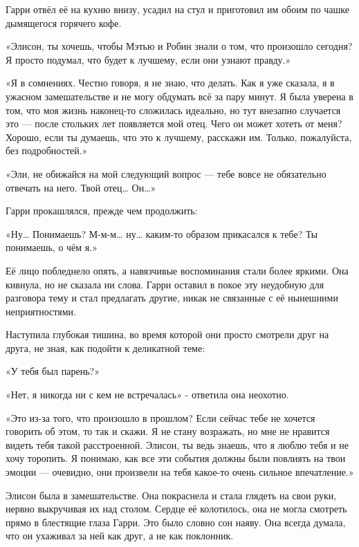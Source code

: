 \documentclass[a4paper,12pt]{book}
\begin{document}
\par
Гарри отвёл её на кухню внизу, усадил на стул и приготовил им обоим по чашке дымящегося горячего кофе.
\par
«Элисон, ты хочешь, чтобы Мэтью и Робин знали о том, что произошло сегодня? Я просто подумал, что будет к лучшему, если они узнают правду.»
\par
«Я в сомнениях. Честно говоря, я не знаю, что делать. Как я уже сказала, я в ужасном замешательстве и не могу обдумать всё за пару минут. Я была уверена в том, что моя жизнь наконец-то сложилась идеально, но тут внезапно случается это — после стольких лет появляется мой отец. Чего он может хотеть от меня? Хорошо, если ты думаешь, что это к лучшему, расскажи им. Только, пожалуйста, без подробностей.»
\par
«Эли, не обижайся на мой следующий вопрос — тебе вовсе не обязательно отвечать на него. Твой отец… Он…»
\par
Гарри прокашлялся, прежде чем продолжить:
\par
«Ну… Понимаешь? М-м-м… ну… каким-то образом прикасался к тебе? Ты понимаешь, о чём я.»
\par
Её лицо побледнело опять, а навязчивые воспоминания стали более яркими. Она кивнула, но не сказала ни слова. Гарри оставил в покое эту неудобную для разговора тему и стал предлагать другие, никак не связанные с её нынешними неприятностями.\\
\par
	Наступила глубокая тишина, во время которой они просто смотрели друг на друга, не зная, как подойти к деликатной теме:
\par
«У тебя был парень?»
\par
«Нет, я никогда ни с кем не встречалась» - ответила она неохотно.
\par
«Это из-за того, что произошло в прошлом? Если сейчас тебе не хочется говорить об этом, то так и скажи. Я не стану возражать, но мне не нравится видеть тебя такой расстроенной. Элисон, ты ведь знаешь, что я люблю тебя и не хочу торопить. Я понимаю, как все эти события должны были повлиять на твои эмоции — очевидно, они произвели на тебя какое-то очень сильное впечатление.»
\par
Элисон была в замешательстве. Она покраснела и стала глядеть на свои руки, нервно выкручивая их над столом. Сердце её колотилось, она не могла смотреть прямо в блестящие глаза Гарри. Это было словно сон наяву. Она всегда думала, что он ухаживал за ней как друг, а не как поклонник.
\par
\end{document}
